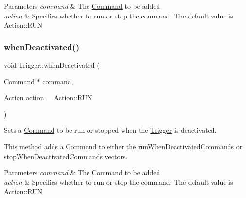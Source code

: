 \begin{DoxyParams}{Parameters}
{\em command} & The \mbox{\hyperlink{classlib_iterative_robot_1_1_command}{Command}} to be added \\
\hline
{\em action} & Specifies whether to run or stop the command. The default value is Action\+::\+R\+UN \\
\hline
\end{DoxyParams}
\mbox{\label{classlib_iterative_robot_1_1_trigger_a6459a2d4d3ca0903bb88102d0752a419}} 
\subsubsection{\texorpdfstring{whenDeactivated()}{whenDeactivated()}}
{\footnotesize\ttfamily void Trigger\+::when\+Deactivated (\begin{DoxyParamCaption}\item[{\mbox{\hyperlink{classlib_iterative_robot_1_1_command}{Command}} $\ast$}]{command,  }\item[{Action}]{action = {\ttfamily Action\+:\+:RUN} }\end{DoxyParamCaption})\hspace{0.3cm}{\ttfamily [protected]}}



Sets a \mbox{\hyperlink{classlib_iterative_robot_1_1_command}{Command}} to be run or stopped when the \mbox{\hyperlink{classlib_iterative_robot_1_1_trigger}{Trigger}} is deactivated. 

This method adds a \mbox{\hyperlink{classlib_iterative_robot_1_1_command}{Command}} to either the run\+When\+Deactivated\+Commands or stop\+When\+Deactivated\+Commands vectors.


\begin{DoxyParams}{Parameters}
{\em command} & The \mbox{\hyperlink{classlib_iterative_robot_1_1_command}{Command}} to be added \\
\hline
{\em action} & Specifies whether to run or stop the command. The default value is Action\+::\+R\+UN \\
\hline
\end{DoxyParams}
\mbox{\label{classlib_iterative_robot_1_1_trigger_a66c9e7fe16d1907aed3f7b3c51bb8917}} 
